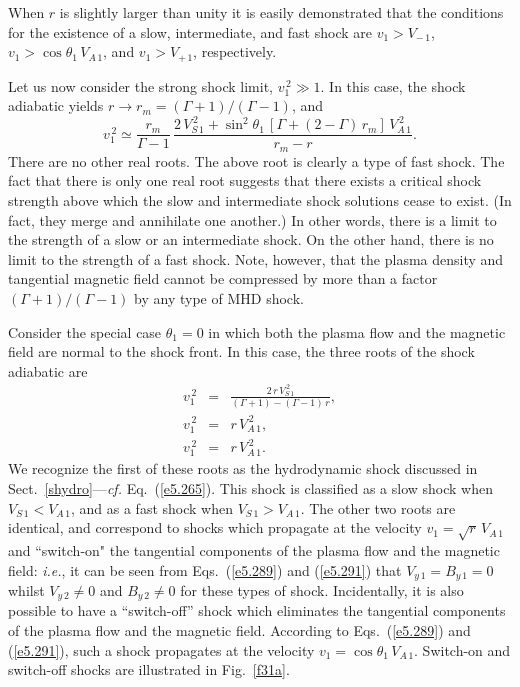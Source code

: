 When $r$ is slightly larger than unity it is easily  demonstrated that the conditions for the
existence of a  slow, intermediate, and fast shock are
$v_1> V_{-\,1}$, $v_1> \cos\theta_1\,V_{A\,1}$,  and $v_1> V_{+\,1}$, respectively.

Let us now consider the strong shock limit, $v_1^{\,2}\gg 1$. In this case, the shock
adiabatic yields $r\rightarrow r_m=(\Gamma+1)/(\Gamma-1)$, and
\begin{equation}
v_1^{\,2} \simeq \frac{r_m}{\Gamma-1}\,\frac{2\,V_{S\,1}^{\,2}+\sin^2\theta_1\,[\Gamma
+ (2-\Gamma)\,r_m]\,V_{A\,1}^{\,2}}{r_m-r}.
\end{equation}
There are no other real roots. The above root is clearly a type of
fast shock. The fact that there is only one real  root suggests that there exists a critical
shock strength above which the slow and intermediate shock solutions  cease to exist. (In fact,
they merge and annihilate one another.)
In other words, there is a limit to the strength of a slow or an intermediate shock.
 On the other hand, there is no limit to the strength of a fast shock. Note, however, that 
  the plasma density and tangential
 magnetic field cannot be compressed by more than a
 factor $(\Gamma+1)/(\Gamma-1)$  by any type of MHD shock.
 
Consider the special case $\theta_1=0$ in which both the plasma flow and the
 magnetic field are normal to the shock front. In this case, the three roots of the shock adiabatic are
 \begin{eqnarray}
 v_1^{\,2} &=& \frac{2\,r\,V_{S\,1}^{\,2}}{(\Gamma+1)-(\Gamma-1)\,r},\\[0.5ex]
 v_1^{\,2} &=& r\,V_{A\,1}^{\,2},\\[0.5ex]
 v_1^{\,2} &=& r\,V_{A\,1}^{\,2}.
 \end{eqnarray}
 We recognize the first of these roots as the hydrodynamic shock discussed in Sect.~\ref{shydro}---{\em cf.} Eq.~(\ref{e5.265}).
 This shock is classified as a slow shock when $V_{S\,1}<V_{A\,1}$, and as a fast shock
 when $V_{S\,1}> V_{A\,1}$. The other two roots are identical, and correspond to
 shocks which propagate at the velocity $v_1 =\sqrt{r}\, V_{A\,1}$ and  ``switch-on" the tangential
 components of the plasma flow and the magnetic field: {\em i.e.}, it can be seen from
 Eqs.~(\ref{e5.289}) and (\ref{e5.291}) that $V_{y\,1}=B_{y\,1} =0$ whilst
 $V_{y\,2}\neq 0$ and $B_{y\,2}\neq 0$ for these types of shock. Incidentally, it is also
 possible to have a ``switch-off'' shock which eliminates the tangential components
 of the plasma flow and the magnetic field. According to Eqs.~(\ref{e5.289}) and (\ref{e5.291}),
 such a shock propagates at the velocity $v_1=\cos\theta_1\,V_{A\,1}$. Switch-on and
 switch-off shocks are illustrated in Fig.~\ref{f31a}.
 
